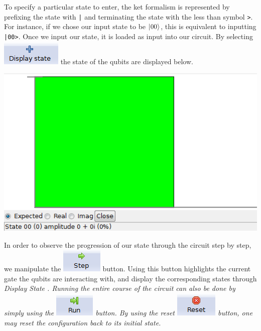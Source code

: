 \documentclass[10pt]{article}
\theoremstyle{definition}
\newcommand{\microspace}{\mspace{0.5mu}}
\def \lket {\left|}
\def \rket {\right\rangle}
\newcommand{\ket}[1]{\lket\microspace #1 \microspace\rket}
\begin{document}
To specify a particular state to enter, the ket formalism is represented by prefixing the 
state with \verb+|+  and terminating the state with the less than symbol \verb+>+. 
For instance, if we chose our input state to be $\ket{00}$, this is equivalent to 
inputting \verb+|00>+. Once we input our state, it is loaded as input into our circuit. 
By selecting \includegraphics[scale=0.60]{Figures/Navigation/DisplayState.png} 
the state of the qubits are displayed below.

\begin{center}
\includegraphics{Figures/CreateCircuit/DisplayState.png}
\end{center}

In order to observe the progression of our state through the circuit step by step, we manipulate the \includegraphics[scale=0.60]{Figures/Navigation/Step.png} button. Using this button highlights the current gate the qubits are interacting with, and display the corresponding states through \em Display State \em. Running the entire course of the circuit can also be done by simply using the \includegraphics[scale=0.60]{Figures/Navigation/Run.png} button. By using the reset \includegraphics[scale=0.60]{Figures/Navigation/Reset.png} button, one may reset the configuration back to its initial state.
\end{document}
